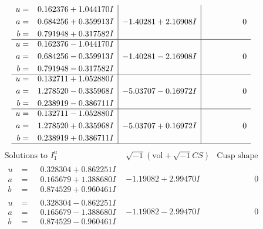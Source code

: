 \documentclass[1p]{elsarticle_modified}
\theoremstyle{definition}
\newcommand{\I}{\sqrt{-1}}
\begin{document}
$$\begin{array}{c|c|c}
\begin{aligned}
u &= \phantom{-}0.162376 + 1.044170 I \\
a &= \phantom{-}0.684256 + 0.359913 I \\
b &= \phantom{-}0.791948 + 0.317582 I\end{aligned}
 & -1.40281 + 2.16908 I & \phantom{-0.000000 } 0 \\ \hline\begin{aligned}
u &= \phantom{-}0.162376 - 1.044170 I \\
a &= \phantom{-}0.684256 - 0.359913 I \\
b &= \phantom{-}0.791948 - 0.317582 I\end{aligned}
 & -1.40281 - 2.16908 I & \phantom{-0.000000 } 0 \\ \hline\begin{aligned}
u &= \phantom{-}0.132711 + 1.052880 I \\
a &= \phantom{-}1.278520 - 0.335968 I \\
b &= \phantom{-}0.238919 - 0.386711 I\end{aligned}
 & -5.03707 - 0.16972 I & \phantom{-0.000000 } 0 \\ \hline\begin{aligned}
u &= \phantom{-}0.132711 - 1.052880 I \\
a &= \phantom{-}1.278520 + 0.335968 I \\
b &= \phantom{-}0.238919 + 0.386711 I\end{aligned}
 & -5.03707 + 0.16972 I & \phantom{-0.000000 } 0\\
 \hline 
 \end{array}$$\newpage$$\begin{array}{c|c|c}  
\text{Solutions to }I^u_{1}& \I (\text{vol} + \sqrt{-1}CS) & \text{Cusp shape}\\
 \hline 
\begin{aligned}
u &= \phantom{-}0.328304 + 0.862251 I \\
a &= \phantom{-}0.165679 + 1.388680 I \\
b &= \phantom{-}0.874529 + 0.960461 I\end{aligned}
 & -1.19082 + 2.99470 I & \phantom{-0.000000 } 0 \\ \hline\begin{aligned}
u &= \phantom{-}0.328304 - 0.862251 I \\
a &= \phantom{-}0.165679 - 1.388680 I \\
b &= \phantom{-}0.874529 - 0.960461 I\end{aligned}
 & -1.19082 - 2.99470 I & \phantom{-0.000000 } 0 \\ \hline\begin{aligned}

\end{aligned}
\end{array}$$
\end{document}
